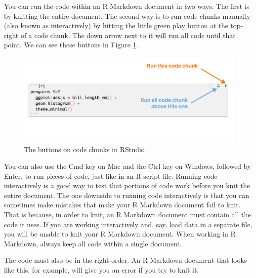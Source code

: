\documentclass[
]{book}
\begin{document}
You can run the code within an R Markdown document in two ways. The first is by knitting the entire document. The second way is to run code chunks manually (also known as interactively) by hitting the little green play button at the top-right of a code chunk. The down arrow next to it will run all code until that point. We can see these buttons in Figure \ref{fig:code-chunk-buttons-annotated}.

\begin{figure}
\includegraphics[width=1\linewidth]{assets/code-chunk-buttons-annotated} \caption{The buttons on code chunks in RStudio}\label{fig:code-chunk-buttons-annotated}
\end{figure}

You can also use the Cmd key on Mac and the Ctrl key on Windows, followed by Enter, to run pieces of code, just like in an R script file. Running code interactively is a good way to test that portions of code work before you knit the entire document.
The one downside to running code interactively is that you can sometimes make mistakes that make your R Markdown document fail to knit. That is because, in order to knit, an R Markdown document must contain all the code it uses. If you are working interactively and, say, load data in a separate file, you will be unable to knit your R Markdown document. When working in R Markdown, always keep all code within a single document.

The code must also be in the right order. An R Markdown document that looks like this, for example, will give you an error if you try to knit it:
\end{document}
